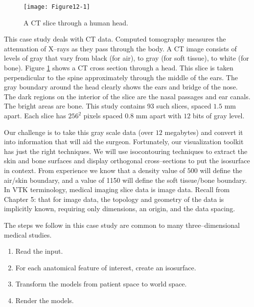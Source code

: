 \begin{figure}[!htb]
	\centering
	\texttt{[image: Figure12-1]}
	\caption{A CT slice through a human head.}
	\label{fig:Figure12-1}
\end{figure}

This case study deals with CT data. Computed tomography measures the attenuation of X--rays as they pass through the body. A CT image consists of levels of gray that vary from black (for air), to gray (for soft tissue), to white (for bone).  Figure \ref{fig:Figure12-1} shows a CT cross section through a head. This slice is taken perpendicular to the spine approximately through the middle of the ears.  The gray boundary around the head clearly shows the ears and bridge of the nose. The dark regions on the interior of the slice are the nasal passages and ear canals. The bright areas are bone. This study contains 93 such slices, spaced $1.5$ mm apart. Each slice has $256^2$ pixels spaced 0.8 mm apart with $12$ bits of gray level.

Our challenge is to take this gray scale data (over $12$ megabytes) and convert it into information that will aid the surgeon. Fortunately, our visualization toolkit has just the right techniques. We will use isocontouring techniques to extract the skin and bone surfaces and display orthogonal cross--sections to put the isosurface in context. From experience we know that a density value of $500$ will define the air/skin boundary, and a value of 1150 will define the soft tissue/bone boundary. In VTK terminology, medical imaging slice data is image data. Recall from Chapter 5:  that for image data, the topology and geometry of the data is implicitly known, requiring only dimensions, an origin, and the data spacing.

The steps we follow in this case study are common to many three--dimensional medical studies.
\begin{enumerate}

    \item Read the input.

    \item For each anatomical feature of interest, create an isosurface.

    \item Transform the models from patient space to world space.

    \item Render the models.

\end{enumerate}

